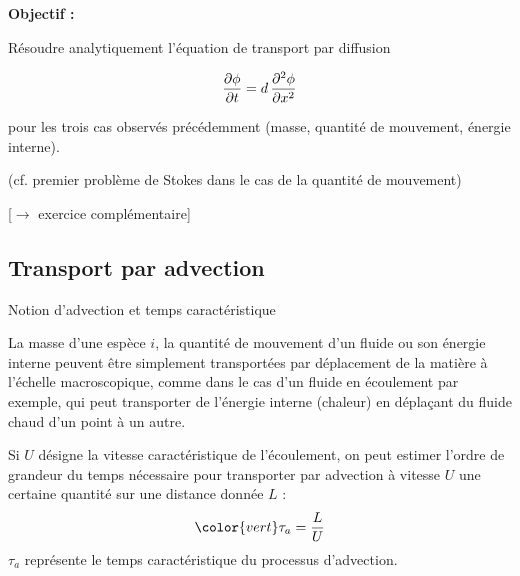 {\begin{frame}{\insertsubsubsectionhead}

\small

\textbf{Objectif :}

\medskip

Résoudre analytiquement l'équation de transport par diffusion

$$
\displaystyle \frac{\partial \phi}{\partial t} = d \, \displaystyle \frac{\partial^2 \phi}{\partial x^2}
$$

\medskip
pour les trois cas observés précédemment (masse, quantité de mouvement, énergie interne).

\bigskip

(cf. \textcolor{vert}{premier problème de Stokes} dans le cas de la quantité de mouvement)

\bigskip

\hfill \textcolor{rouge}{[$\longrightarrow$ exercice complémentaire]}

\vspace{35mm}

\end{frame}


%

\subsection{Transport par advection}

\begin{frame}{Notion d'advection et temps caractéristique}

\small

La masse d'une espèce $i$, la quantité de mouvement d'un fluide ou son énergie interne peuvent être
simplement transportées par \textcolor{rouge}{déplacement de la matière à l'échelle macroscopique}, comme dans le cas
d'un fluide en écoulement par exemple, qui peut transporter de l'énergie interne (chaleur) en déplaçant 
du fluide chaud d'un point à un autre.

\bigskip
\pause

Si $U$ désigne la vitesse caractéristique de l'écoulement, on peut estimer l'ordre de grandeur du
temps nécessaire pour transporter par advection à vitesse $U$ une certaine quantité sur une distance donnée $L$ : 
\[
\color{vert}
	\tau_a = \frac{L}{U}
\]
$\tau_a$ représente le \textcolor{rouge}{temps caractéristique du processus d'advection}.


\end{frame}}

